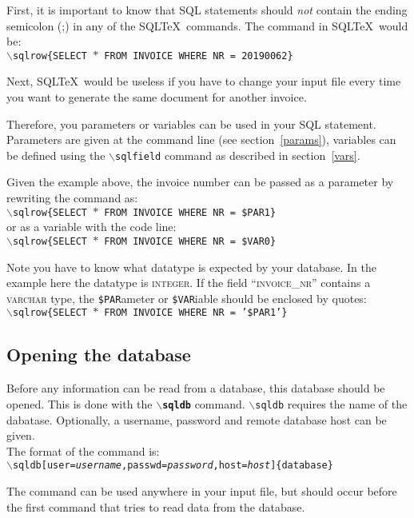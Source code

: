 \documentclass{article}
\newcommand{\bs}{\ensuremath{\backslash}}
\newcommand{\vs}{\vspace{3mm}}
\begin{document}
First, it is important to know that SQL statements should \textit{not} contain the ending semicolon (;) in
any of the SQL\TeX\ commands. The command in SQL\TeX\ would be:\\
\texttt{\bs sqlrow\{SELECT $\ast$ FROM INVOICE WHERE NR = 20190062\}}

Next, SQL\TeX\ would be useless if you have to change your input file every time you want to generate
the same document for another invoice.

\vs

Therefore, you parameters or variables can be used in your SQL statement. Parameters are given at the command
line (see section~\ref{params}), variables can be defined using the \texttt{\bs sqlfield} command as
described in section~\ref{vars}.

Given the example above, the invoice number can be passed as a parameter by rewriting the command as: \\
\texttt{\bs sqlrow\{SELECT $\ast$ FROM INVOICE WHERE NR = \$PAR1\}} \\
or as a variable with the code line: \\
\texttt{\bs sqlrow\{SELECT $\ast$ FROM INVOICE WHERE NR = \$VAR0\}}

Note you have to know what datatype is expected by your database. In the example here the datatype is
\textsc{integer}. If the field ``\textsc{invoice\_nr}'' contains a \textsc{varchar} type, the
\texttt{\$PAR}ameter or \texttt{\$VAR}iable should be enclosed by quotes: \\
\texttt{\bs sqlrow\{SELECT $\ast$ FROM INVOICE WHERE NR = '\$PAR1'\}}

\subsection{Opening the database}\label{opendb}

Before any information can be read from a database, this database should be opened.
This is done with the \texttt{\textbf{\bs sqldb}} command.
\texttt{\bs sqldb} requires the name of the dabatase. Optionally, a username, password and remote database host can be given. \\
The format of the command is:\\
\texttt{\bs sqldb[user=\textit{username},passwd=\textit{password},host=\textit{host}]\{database\}}

The command can be used anywhere in your input file, but should occur before the first command that tries to
read data from the database.
\end{document}
